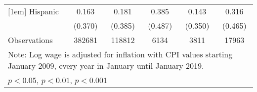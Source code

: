 \begin{table}[htbp]
\begin{tabular}{l*{5}{c}}
[1em]
Hispanic            &       0.163         &       0.181         &       0.385         &       0.143         &       0.316         \\
                    &     (0.370)         &     (0.385)         &     (0.487)         &     (0.350)         &     (0.465)         \\
\hline
Observations        &      382681         &      118812         &        6134         &        3811         &       17963         \\
\hline\hline
\multicolumn{6}{l}{\footnotesize Note: Log wage is adjusted for inflation with CPI values starting January 2009, every year in January until January 2019.}\\
\multicolumn{6}{l}{\footnotesize \sym{*} \(p<0.05\), \sym{**} \(p<0.01\), \sym{***} \(p<0.001\)}\\
\end{tabular}
\end{table}
